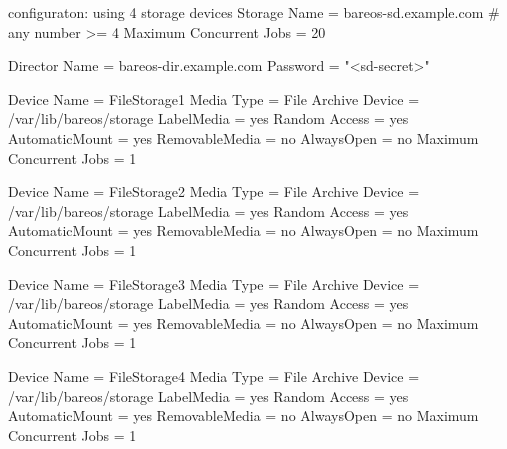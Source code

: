 \begin{bconfig}{\bareosSd configuraton: using 4 storage devices}
Storage {
  Name = bareos-sd.example.com
  # any number >= 4
  Maximum Concurrent Jobs = 20
}

Director {
  Name = bareos-dir.example.com
  Password = "<sd-secret>"
}

Device {
  Name = FileStorage1
  Media Type = File
  Archive Device = /var/lib/bareos/storage
  LabelMedia = yes
  Random Access = yes
  AutomaticMount = yes
  RemovableMedia = no
  AlwaysOpen = no
  Maximum Concurrent Jobs = 1
}

Device {
  Name = FileStorage2
  Media Type = File
  Archive Device = /var/lib/bareos/storage
  LabelMedia = yes
  Random Access = yes
  AutomaticMount = yes
  RemovableMedia = no
  AlwaysOpen = no
  Maximum Concurrent Jobs = 1
}

Device {
  Name = FileStorage3
  Media Type = File
  Archive Device = /var/lib/bareos/storage
  LabelMedia = yes
  Random Access = yes
  AutomaticMount = yes
  RemovableMedia = no
  AlwaysOpen = no
  Maximum Concurrent Jobs = 1
}

Device {
  Name = FileStorage4
  Media Type = File
  Archive Device = /var/lib/bareos/storage
  LabelMedia = yes
  Random Access = yes
  AutomaticMount = yes
  RemovableMedia = no
  AlwaysOpen = no
  Maximum Concurrent Jobs = 1
}
\end{bconfig}
